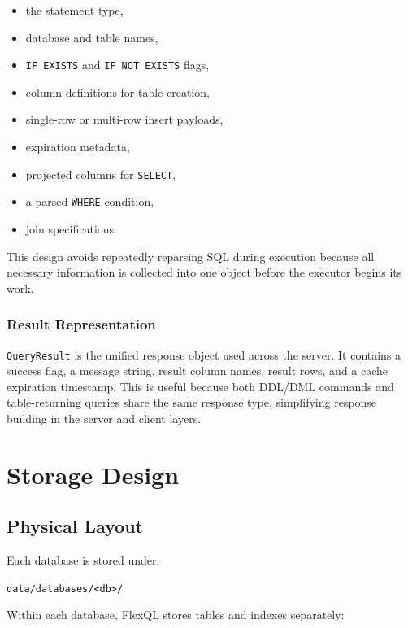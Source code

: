 \documentclass[12pt,a4paper]{article}
\begin{document}
\begin{itemize}[leftmargin=1.8em]
  \item the statement type,
  \item database and table names,
  \item \texttt{IF EXISTS} and \texttt{IF NOT EXISTS} flags,
  \item column definitions for table creation,
  \item single-row or multi-row insert payloads,
  \item expiration metadata,
  \item projected columns for \texttt{SELECT},
  \item a parsed \texttt{WHERE} condition,
  \item join specifications.
\end{itemize}

This design avoids repeatedly reparsing SQL during execution because all
necessary information is collected into one object before the executor begins
its work.

\subsubsection{Result Representation}

\texttt{QueryResult} is the unified response object used across the server. It
contains a success flag, a message string, result column names, result rows,
and a cache expiration timestamp. This is useful because both DDL/DML commands
and table-returning queries share the same response type, simplifying response
building in the server and client layers.

\section{Storage Design}

\subsection{Physical Layout}

Each database is stored under:

\begin{center}
\texttt{data/databases/<db>/}
\end{center}

Within each database, FlexQL stores tables and indexes separately:
\end{document}
